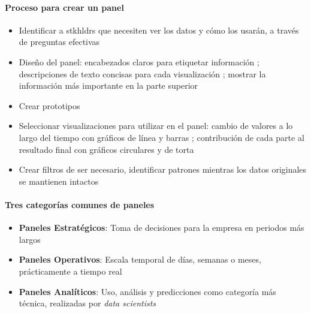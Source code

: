 \paragraph{Proceso para crear un panel}
    \begin{itemize}
        \item {Identificar a \Gls{stkhldrs} que necesiten ver los datos y cómo los usarán, a través de preguntas efectivas}
        \item {Diseño del panel: encabezados claros para etiquetar información ; descripciones de texto concisas para cada visualización ; mostrar la información más importante en la parte superior}
        \item {Crear prototipos}
        \item {Seleccionar visualizaciones para utilizar en el panel: cambio de valores a lo largo del tiempo con gráficos de línea y barras ; contribución de cada parte al resultado final con gráficos circulares y de torta}
        \item {Crear filtros de ser necesario, identificar patrones mientras los datos originales se mantienen intactos}
    \end{itemize}
\paragraph{Tres categorías comunes de paneles}
    \begin{itemize}
        \item {\textbf{Paneles Estratégicos}: Toma de decisiones para la empresa en periodos más largos}
        \item {\textbf{Paneles Operativos}: Escala temporal de días, semanas o meses, prácticamente a tiempo real}
        \item {\textbf{Paneles Analíticos}: Uso, análisis y predicciones como categoría más técnica, realizadas por \textit{data scientists}}
    \end{itemize}